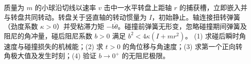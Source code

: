 质量为 \(m\) 的小球沿切线以速率 \(v\) 击中一水平转盘上距轴 \(r\) 的捕获槽，立即嵌入并与转盘共同转动。转盘关于竖直轴的转动惯量为 \(I\)，初始静止。轴连接扭转弹簧（劲度系数 \(\kappa>0\)）并受粘滞力矩 \(-b\dot\theta\)。碰撞前弹簧无形变，忽略碰撞期间弹簧及阻尼的角冲量，碰后阻尼系数 \(b>0\) 满足 \(b^2<4\kappa(I+mr^2)\)。
(1) 求碰后瞬时角速度与碰撞损失的机械能；(2) 求 \(t>0\) 的角位移与角速度；(3) 求第一个正向转角极大值及发生时刻；(4) 验证 \(b\to0^+\) 的无阻尼极限。
